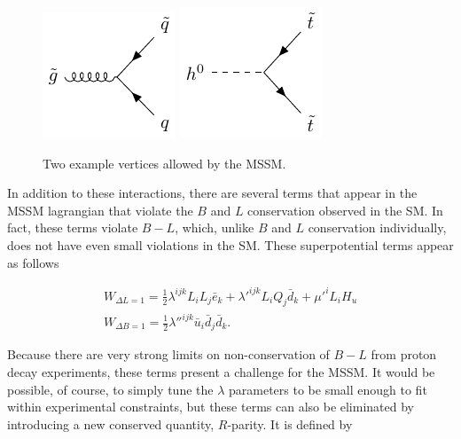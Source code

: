 \begin{centering}
\begin{figure}[!hbt]
\myfloatalign
\includegraphics[width=.45\linewidth]{feynman/gluino.pdf}
\includegraphics[width=.45\linewidth]{feynman/higgs_stop.pdf}
\caption{Two example vertices allowed by the \ac{MSSM}.}
\label{fig:mssm_int}
\end{figure}
\end{centering}

In addition to these interactions, there are several terms that appear in the \ac{MSSM} lagrangian that violate the $B$ and $L$ conservation observed in the \ac{SM}. In fact, these terms violate $B-L$, which, unlike $B$ and $L$ conservation individually, does not have even small violations in the \ac{SM}. These superpotential terms appear as follows

\begin{eqnarray}
W_{\Delta L = 1} = \frac{1}{2}\lambda^{ijk}L_i L_j \bar{e}_k + \lambda'^{ijk}L_i Q_j \bar{d}_k + \mu'^i L_i H_u \\
W_{\Delta B = 1} = \frac{1}{2}\lambda''^{ijk}\bar{u}_i \bar{d}_j \bar{d}_k .
\label{eq:rviol}
\end{eqnarray}

Because there are very strong limits on non-conservation of $B-L$ from proton decay experiments, these terms present a challenge for the \ac{MSSM}. It would be possible, of course, to simply tune the $\lambda$ parameters to be small enough to fit within experimental constraints, but these terms can also be eliminated by introducing a new conserved quantity, $R$-parity. It is defined by

